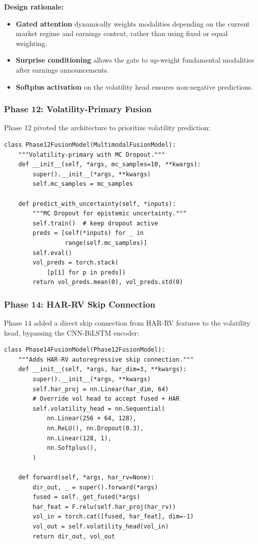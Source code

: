 \documentclass[12pt, a4paper]{article}
\begin{document}
\textbf{Design rationale:}
\begin{itemize}[nosep]
    \item \textbf{Gated attention} dynamically weights modalities depending on the current market regime and earnings context, rather than using fixed or equal weighting.
    \item \textbf{Surprise conditioning} allows the gate to up-weight fundamental modalities after earnings announcements.
    \item \textbf{Softplus activation} on the volatility head ensures non-negative predictions.
\end{itemize}

\subsubsection{Phase 12: Volatility-Primary Fusion}

Phase 12 pivoted the architecture to prioritize volatility prediction:

\begin{lstlisting}[caption={Phase 12 fusion model additions}]
class Phase12FusionModel(MultimodalFusionModel):
    """Volatility-primary with MC Dropout."""
    def __init__(self, *args, mc_samples=10, **kwargs):
        super().__init__(*args, **kwargs)
        self.mc_samples = mc_samples
    
    def predict_with_uncertainty(self, *inputs):
        """MC Dropout for epistemic uncertainty."""
        self.train()  # keep dropout active
        preds = [self(*inputs) for _ in
                 range(self.mc_samples)]
        self.eval()
        vol_preds = torch.stack(
            [p[1] for p in preds])
        return vol_preds.mean(0), vol_preds.std(0)
\end{lstlisting}

\subsubsection{Phase 14: HAR-RV Skip Connection}

Phase 14 added a direct skip connection from HAR-RV features to the volatility head, bypassing the CNN-BiLSTM encoder:

\begin{lstlisting}[caption={Phase 14 HAR-RV skip path}]
class Phase14FusionModel(Phase12FusionModel):
    """Adds HAR-RV autoregressive skip connection."""
    def __init__(self, *args, har_dim=3, **kwargs):
        super().__init__(*args, **kwargs)
        self.har_proj = nn.Linear(har_dim, 64)
        # Override vol head to accept fused + HAR
        self.volatility_head = nn.Sequential(
            nn.Linear(256 + 64, 128),
            nn.ReLU(), nn.Dropout(0.3),
            nn.Linear(128, 1),
            nn.Softplus(),
        )
    
    def forward(self, *args, har_rv=None):
        dir_out, _ = super().forward(*args)
        fused = self._get_fused(*args)
        har_feat = F.relu(self.har_proj(har_rv))
        vol_in = torch.cat([fused, har_feat], dim=-1)
        vol_out = self.volatility_head(vol_in)
        return dir_out, vol_out
\end{lstlisting}
\end{document}
